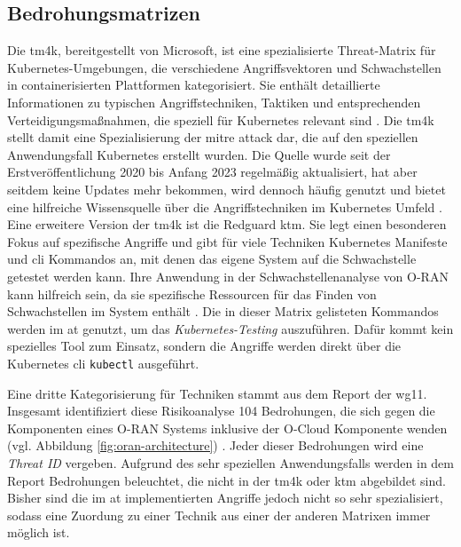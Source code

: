 \subsection{Bedrohungsmatrizen}
\par Die \gls{tm4k}, bereitgestellt von Microsoft, ist eine spezialisierte Threat-Matrix für Kubernetes-Umgebungen, die verschiedene Angriffsvektoren und Schwachstellen in containerisierten Plattformen kategorisiert. Sie enthält detaillierte Informationen zu typischen Angriffstechniken, Taktiken und entsprechenden Verteidigungsmaßnahmen, die speziell für Kubernetes relevant sind \autocite{TacticsThreatMatrix}. Die \gls{tm4k} stellt damit eine Spezialisierung der \gls{mitre} \gls{attack} dar, die auf den speziellen Anwendungsfall Kubernetes erstellt wurden. Die Quelle wurde seit der Erstveröffentlichung 2020 bis Anfang 2023 regelmäßig aktualisiert, hat aber seitdem keine Updates mehr bekommen, wird dennoch häufig genutzt und bietet eine hilfreiche Wissensquelle über die Angriffstechniken im Kubernetes Umfeld \autocite{DeploymentsMicrosoftThreatMatrixforKubernetes}. Eine erweitere Version der \gls{tm4k} ist die Redguard \gls{ktm}. Sie legt einen besonderen Fokus auf spezifische Angriffe und gibt für viele Techniken Kubernetes Manifeste und \gls{cli} Kommandos an, mit denen das eigene System auf die Schwachstelle getestet werden kann. Ihre Anwendung in der Schwachstellenanalyse von O-RAN kann hilfreich sein, da sie spezifische Ressourcen für das Finden von Schwachstellen im System enthält \autocite{KubernetesThreatMatrix}. Die in dieser Matrix gelisteten Kommandos werden im \gls{at} genutzt, um das \textit{Kubernetes-Testing} auszuführen. Dafür kommt kein spezielles Tool zum Einsatz, sondern die Angriffe werden direkt über die Kubernetes \gls{cli} \verb|kubectl| ausgeführt.
\par Eine dritte Kategorisierung für Techniken stammt aus dem Report der \orana{} \gls{wg11}. Insgesamt identifiziert diese Risikoanalyse 104 Bedrohungen, die sich gegen die Komponenten eines O-RAN Systems inklusive der O-Cloud Komponente wenden (vgl. Abbildung \ref{fig:oran-architecture}) \autocite{o-ranworkgroup11securityworkgroupORANSecurityThreat2024}. Jeder dieser Bedrohungen wird eine \textit{Threat ID} vergeben. Aufgrund des sehr speziellen Anwendungsfalls werden in dem Report Bedrohungen beleuchtet, die nicht in der \gls{tm4k} oder \gls{ktm} abgebildet sind. Bisher sind die im \gls{at} implementierten Angriffe jedoch nicht so sehr spezialisiert, sodass eine Zuordung zu einer Technik aus einer der anderen Matrixen immer möglich ist.
